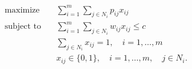 \begin{align*}
\text{maximize} \quad & \sum_{i=1}^m \sum_{j \in N_i} p_{ij} x_{ij} \\
\text{subject to} \quad & \sum_{i=1}^m \sum_{j \in N_i} w_{ij} x_{ij} \leq c \\
& \sum_{j \in N_i} x_{ij} = 1, \quad i = 1, \ldots, m \\
& x_{ij} \in \lbrace 0, 1 \rbrace, \quad i = 1, \ldots, m, \quad j \in N_i.
\end{align*}


